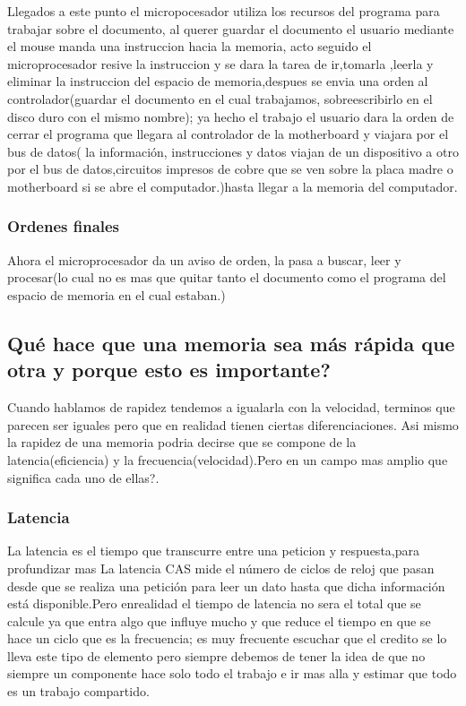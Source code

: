 \documentclass{article}
\begin{document}
        Llegados a este punto el micropocesador utiliza los recursos del programa para trabajar sobre el documento, al querer guardar el documento el usuario mediante el mouse manda una instruccion hacia la memoria, acto seguido el microprocesador resive la instruccion y se dara la tarea de ir,tomarla ,leerla y eliminar la instruccion del espacio de memoria,despues se envia  una orden al controlador(guardar el documento en el cual trabajamos, sobreescribirlo en el disco duro con el mismo nombre); ya hecho el trabajo el usuario dara la orden de cerrar el programa que llegara al controlador de la motherboard y viajara por el bus de datos( la información, instrucciones y datos viajan de un dispositivo a otro por el bus de datos,circuitos impresos de cobre que se ven sobre la placa madre o
        motherboard si se abre el computador.)hasta llegar  a la memoria del computador.\cite{profe}
        
        \subsubsection{Ordenes finales} Ahora el microprocesador da  un aviso de orden, la pasa a buscar, leer y procesar(lo cual no es mas que quitar tanto el documento como el programa del espacio de memoria en el cual estaban.)
        

    \subsection{Qué hace que una memoria sea más rápida que otra y porque esto es importante?}
    
    Cuando hablamos de rapidez tendemos a igualarla con la velocidad, terminos que parecen ser iguales pero que en realidad tienen ciertas diferenciaciones. Asi mismo la rapidez de  una memoria podria decirse que se compone de la latencia(eficiencia) y la frecuencia(velocidad).Pero en un campo mas amplio que significa cada uno de ellas?.
    
        \subsubsection{Latencia} La latencia es el tiempo que transcurre entre una peticion y respuesta,para profundizar mas La latencia CAS mide el número de ciclos de reloj que pasan desde que se realiza una petición para leer un dato hasta que dicha información está disponible\cite{profesional}.Pero enrealidad el tiempo de latencia no sera el total que se calcule ya que entra algo que influye mucho y que reduce el tiempo en que se hace un ciclo que es la frecuencia; es muy frecuente escuchar que el credito se lo lleva este tipo de elemento pero siempre debemos de tener la idea de que no siempre un componente hace solo todo el trabajo e ir mas alla y estimar que todo es un trabajo compartido.
        
\end{document}
